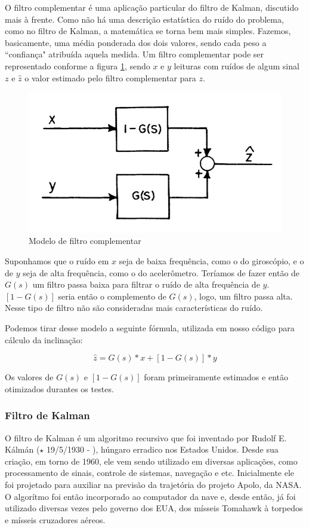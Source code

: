 \documentclass[a4paper,12pt]{article}
\begin{document}
O filtro complementar é uma aplicação particular do filtro de Kalman, discutido mais à frente. Como não há uma descrição estatística do ruído do problema, como no filtro de Kalman, a matemática se torna bem mais simples. Fazemos, basicamente, uma média ponderada dos dois valores, sendo cada peso a ``confiança" atribuída aquela medida. Um filtro complementar pode ser representado conforme a figura \ref{complementar}, sendo $x$ e $y$ leituras com ruídos de algum sinal $z$ e $\hat{z}$ o valor estimado pelo filtro complementar para $z$.

\begin{figure}[H]
\centering
\includegraphics[width=.7\textwidth]{img/complementar.png}
\caption{Modelo de filtro complementar}
\label{complementar}
\end{figure}

Suponhamos que o ruído em $x$ seja de baixa frequência, como o do giroscópio, e o de $y$ seja de alta frequência, como o do acelerômetro. Teríamos de fazer então de $G(s)$ um filtro passa baixa para filtrar o ruído de alta frequência de $y$. $[1-G(s)]$ seria então o complemento de $G(s)$, logo, um filtro passa alta. Nesse tipo de filtro não são consideradas mais características do ruído.

Podemos tirar desse modelo a seguinte fórmula, utilizada em nosso código para cálculo da inclinação: 

\begin{equation}
\hat{z}=G(s)*x+[1-G(s)]*y
\end{equation}

Os valores de $G(s)$ e $[1-G(s)]$ foram primeiramente estimados e então otimizados durantes os testes.
\subsubsection{Filtro de Kalman}

O filtro de Kalman é um algoritmo recursivo que foi inventado por Rudolf E. Kálmán ($\star$ 19/5/1930 - ), húngaro erradico nos Estados Unidos. Desde sua criação, em torno de 1960, ele vem sendo utilizado em diversas aplicações, como processamento de sinais, controle de sistemas, navegação e etc. Inicialmente ele foi projetado para auxiliar na previsão da trajetória do projeto Apolo, da NASA. O algorítmo foi então incorporado ao computador da nave e, desde então, já foi utilizado diversas vezes pelo governo dos EUA, dos mísseis Tomahawk à torpedos e mísseis cruzadores aéreos.
\end{document}
